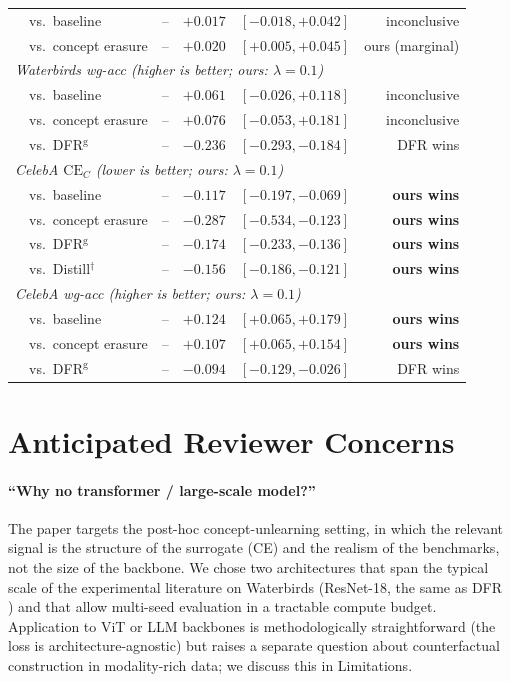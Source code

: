 \documentclass{article}
\newcommand{\CE}{\mathrm{CE}}
\begin{document}
\begin{table}[h]
\begin{tabular}{llrrr}
~~vs.\ baseline       & --               & $+0.017$ & $[-0.018, +0.042]$ & inconclusive \\
~~vs.\ concept erasure & --              & $+0.020$ & $[+0.005, +0.045]$ & ours (marginal) \\
\midrule
\multicolumn{5}{l}{\textit{Waterbirds wg-acc (higher is better; ours: $\lambda{=}0.1$)}} \\
~~vs.\ baseline       & --               & $+0.061$ & $[-0.026, +0.118]$ & inconclusive \\
~~vs.\ concept erasure & --              & $+0.076$ & $[-0.053, +0.181]$ & inconclusive \\
~~vs.\ DFR$^{\mathrm{g}}$  & --          & $-0.236$ & $[-0.293, -0.184]$ & DFR wins \\
\midrule
\multicolumn{5}{l}{\textit{CelebA $\CE_C$ (lower is better; ours: $\lambda{=}0.1$)}} \\
~~vs.\ baseline       & --               & $-0.117$ & $[-0.197, -0.069]$ & \textbf{ours wins} \\
~~vs.\ concept erasure & --              & $-0.287$ & $[-0.534, -0.123]$ & \textbf{ours wins} \\
~~vs.\ DFR$^{\mathrm{g}}$  & --          & $-0.174$ & $[-0.233, -0.136]$ & \textbf{ours wins} \\
~~vs.\ Distill$^{\dagger}$ & --          & $-0.156$ & $[-0.186, -0.121]$ & \textbf{ours wins} \\
\midrule
\multicolumn{5}{l}{\textit{CelebA wg-acc (higher is better; ours: $\lambda{=}0.1$)}} \\
~~vs.\ baseline       & --               & $+0.124$ & $[+0.065, +0.179]$ & \textbf{ours wins} \\
~~vs.\ concept erasure & --              & $+0.107$ & $[+0.065, +0.154]$ & \textbf{ours wins} \\
~~vs.\ DFR$^{\mathrm{g}}$  & --          & $-0.094$ & $[-0.129, -0.026]$ & DFR wins \\
\bottomrule
\end{tabular}
\end{table}


\section{Anticipated Reviewer Concerns}
\label{app:rebuttal}

\paragraph{``Why no transformer / large-scale model?''}
The paper targets the post-hoc concept-unlearning setting, in which the
relevant signal is the structure of the surrogate (CE) and the realism of the
benchmarks, not the size of the backbone.  We chose two architectures that
span the typical scale of the experimental literature on Waterbirds
(ResNet-18, the same as DFR \cite{kirichenko2023last}) and that allow
multi-seed evaluation in a tractable compute budget.  Application to ViT or
LLM backbones is methodologically straightforward (the loss is
architecture-agnostic) but raises a separate question about counterfactual
construction in modality-rich data; we discuss this in Limitations.
\end{document}

